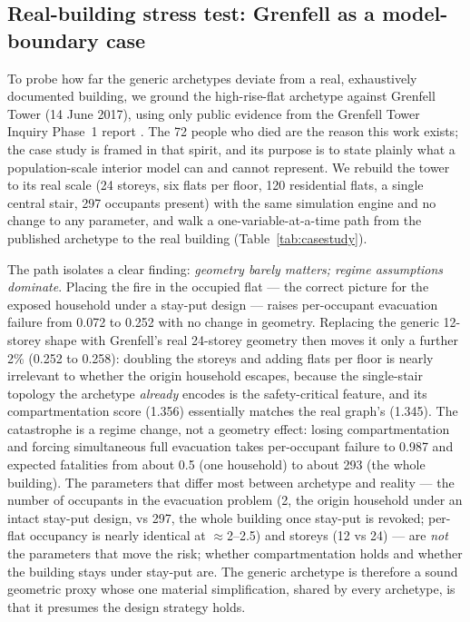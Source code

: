 \subsection{Real-building stress test: Grenfell as a model-boundary case}
\label{sec:results-casestudy}

To probe how far the generic archetypes deviate from a real, exhaustively documented
building, we ground the high-rise-flat archetype against Grenfell Tower (14 June
2017), using only public evidence from the Grenfell Tower Inquiry Phase~1 report
\citep{grenfell2019phase1}. The 72 people who died are the reason this work exists;
the case study is framed in that spirit, and its purpose is to state plainly what a
population-scale interior model can and cannot represent. We rebuild the tower to its
real scale (24 storeys, six flats per floor, 120 residential flats, a single central
stair, 297 occupants present) with the same simulation engine and no change to any
parameter, and walk a one-variable-at-a-time path from the published archetype to the
real building (Table~\ref{tab:casestudy}).

The path isolates a clear finding: \emph{geometry barely matters; regime assumptions
dominate}. Placing the fire in the occupied flat --- the correct picture for the
exposed household under a stay-put design --- raises per-occupant evacuation failure
from 0.072 to 0.252 with no change in geometry. Replacing the generic 12-storey shape
with Grenfell's real 24-storey geometry then moves it only a further 2\% (0.252 to
0.258): doubling the storeys and adding flats per floor is nearly irrelevant to
whether the origin household escapes, because the single-stair topology the archetype
\emph{already} encodes is the safety-critical feature, and its compartmentation score
(1.356) essentially matches the real graph's (1.345). The catastrophe is a regime
change, not a geometry effect: losing compartmentation and forcing simultaneous full
evacuation takes per-occupant failure to 0.987 and expected fatalities from about 0.5
(one household) to about 293 (the whole building). The parameters that differ most
between archetype and reality --- the number of occupants in the evacuation problem
(2, the origin household under an intact stay-put design, vs 297, the whole building
once stay-put is revoked; per-flat occupancy is nearly identical at $\approx$2--2.5)
and storeys (12 vs 24) --- are \emph{not} the parameters that move the risk; whether compartmentation holds and
whether the building stays under stay-put are. The generic archetype is therefore a
sound geometric proxy whose one material simplification, shared by every archetype,
is that it presumes the design strategy holds.


